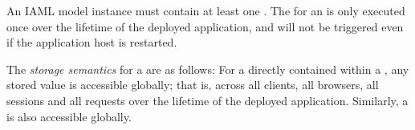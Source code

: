 An IAML model instance must contain at least one . The   for an  is only executed once over the lifetime of the deployed application, and will not be triggered even if the application host is restarted.

The \textit{storage semantics} for a  are as follows: For a  directly contained within a , any stored value is accessible globally; that is, across all clients, all browsers, all sessions and all requests over the lifetime of the deployed application. Similarly, a  is also accessible globally.